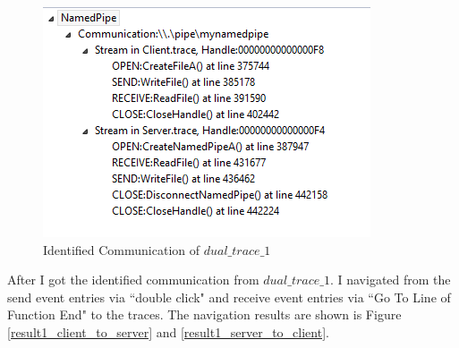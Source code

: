 \begin{figure}[H]
\centerline{\includegraphics[scale=0.65]{Figures/result1_communications}}
 \caption{Identified Communication of $dual\_trace\_1$}
\label{result1_communications}
\end{figure}


After I got the identified communication from $dual\_trace\_1$. I navigated from the send event entries via ``double click" and receive event entries via ``Go To Line of Function End" to the traces. The navigation results are shown is Figure \ref{result1_client_to_server} and \ref{result1_server_to_client}.

